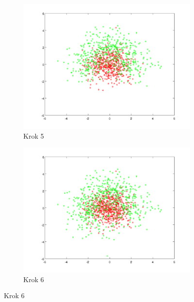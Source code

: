 \documentclass[10pt,a4paper]{article}
\begin{document}
\begin{figure}[H]
  \begin{subfigure}[b]{0.4\textwidth}
    \includegraphics[width=\textwidth]{dataGen_step4.png}
    \caption{Krok 5}
  \end{subfigure}
  \hfill
  \begin{subfigure}[b]{0.4\textwidth}
    \includegraphics[width=\textwidth]{dataGen_step5.png}
    \caption{Krok 6}
  \end{subfigure}
  

\end{figure}
\end{document}
